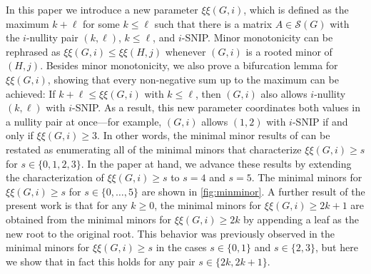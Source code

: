 \documentclass{article}
\theoremstyle{definition}
\newcommand{\mptn}{\mathcal{S}} %
\newcommand{\excise}{\xi\xi}
\begin{document}
In this paper we introduce a new parameter $\excise(G,i)$, which is defined as the maximum $k + \ell$ for some $k\leq \ell$ such that there is a matrix $A\in\mptn(G)$ with the $i$-nullity pair $(k,\ell)$, $k\leq \ell$, and $i$-SNIP.
Minor monotonicity can be rephrased as $\excise(G,i) \leq \excise(H,j)$ whenever $(G,i)$ is a rooted minor of $(H,j)$.
Besides minor monotonicity, we also prove a bifurcation lemma for $\excise(G,i)$,
showing that every non-negative sum up to the maximum can be achieved:
If $k + \ell \leq \excise(G,i)$ with $k\leq \ell$, then $(G,i)$ also allows $i$-nullity $(k,\ell)$ with $i$-SNIP.  As a result, this new parameter coordinates both values in a nullity pair at once---for example, $(G,i)$ allows $(1,2)$ with $i$-SNIP if and only if $\excise(G,i) \geq 3$.  
In other words, the minimal minor results of \cite{SNIP} can be restated as enumerating all of the minimal minors that characterize $\excise(G, i) \geq s$ for $s \in \{ 0,1,2,3\}$.
In the paper at hand, we advance these results by extending the characterization of $\excise(G, i) \geq s$ to $s=4$ and $s=5$.
The minimal minors for $\excise(G, i) \geq s$ for $s \in \{0, \ldots, 5\}$ are shown in \cref{fig:minminor}.
A further result of the present work is that for any $k \geq 0$, the minimal minors for $\excise(G, i) \geq 2k+1$ are obtained from the minimal minors for $\excise(G, i) \geq 2k$ by appending a leaf as the new root to the original root.
This behavior was previously observed in the minimal minors for $\excise(G, i) \geq s$ in the cases $s \in \{0, 1\}$ and $s \in \{ 2, 3\} $, but here we show that in fact this holds for any pair $s \in \{2k, 2k+1\}$. %
\end{document}
